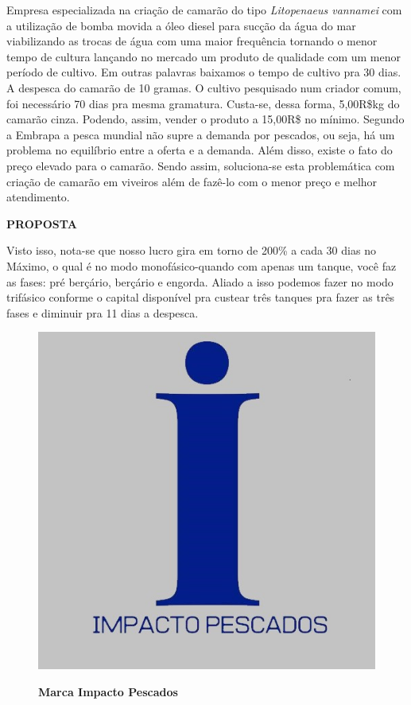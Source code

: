 Empresa especializada na criação de camarão do tipo \textit{Litopenaeus vannamei} com a utilização de bomba movida a óleo diesel para sucção da água do mar viabilizando as trocas de água com uma maior frequência tornando o menor tempo de cultura lançando no mercado um produto de qualidade com um menor período de cultivo. Em outras palavras baixamos o tempo de cultivo pra 30 dias. A despesca do camarão de 10 gramas. O cultivo pesquisado num criador comum, foi necessário 70 dias pra mesma gramatura. Custa-se, dessa forma, 5,00R\$kg do camarão cinza. Podendo, assim, vender o produto a 15,00R\$ no mínimo. Segundo a Embrapa a pesca mundial não supre a demanda por pescados, ou seja, há um problema no equilíbrio entre a oferta e a demanda. Além disso, existe o fato do preço elevado para o camarão. Sendo assim, soluciona-se esta problemática com criação de camarão em viveiros além de fazê-lo com o menor preço e melhor atendimento.

\textbf{PROPOSTA}

Visto isso, nota-se que nosso lucro gira em torno de 200\% a cada 30 dias no Máximo, o qual é no modo monofásico-quando com apenas um tanque, você faz as fases: pré berçário, berçário e engorda. Aliado a isso podemos fazer no modo trifásico conforme o capital disponível pra custear três tanques pra fazer as três fases e diminuir pra 11 dias a despesca.

\begin{figure}[!htb]
\centering
\caption{\textbf{Marca Impacto Pescados}}
\includegraphics[scale=0.4]{Imagens/imacto_pescados.jpg}
\label{figura_23}
\end{figure}
\newpage


